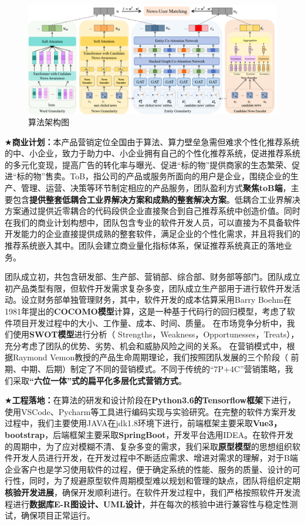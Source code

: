 \documentclass[withoutpreface,bwprint]{cumcmthesis} %
\begin{document}
		\begin{figure}[H]
				\includegraphics[width=1.0\textwidth]{MGCA}
			\caption{算法架构图}
			\label{fig:circuit-diagcam}
		\end{figure}
	    $\bigstar$\textbf{商业计划：}本产品营销定位全国由于算法、算力壁垒急需但难求个性化推荐系统的中、小企业，致力于助力中、小企业拥有自己的个性化推荐系统，促进推荐系统的多元化变现，提高广告的转化率与曝光、促进“标的物”提供商家的生态繁荣、促进“标的物”售卖。ToB，指公司的产品或服务所面向的用户是企业，围绕企业的生产、管理、运营、决策等环节制定相应的产品服务，团队盈利方式\textbf{聚焦toB端}，主要包含\textbf{提供整套低耦合工业界解决方案和成熟的整套解决方案}。低耦合工业界解决方案通过提供近零耦合的代码段供企业直接聚合到自己推荐系统中创造价值。同时在我们的商业计划构想中，团队包含专业的软件开发人员，可以直接为不具备软件开发能力的企业直接提供成熟的整套软件，满足企业的个性化需求，并且将我们的推荐系统嵌入其中。团队会建立商业量化指标体系，保证推荐系统真正的落地业务。\par
	    团队成立初，共包含研发部、生产部、营销部、综合部、财务部等部门。团队成立初产品类型有限，但软件开发需求复杂多变，团队成立生产部用于进行软件开发活动。设立财务部单独管理财务，其中，软件开发的成本估算采用Barry Boehm在1981年提出的\textbf{COCOMO模型}计算，这是一种基于代码行的回归模型，考虑了软件项目开发过程中的大小、工作量、成本、时间、质量。
	    在市场竞争分析中，我们使用\textbf{SWOT模型}进行分析（ Strengths，Weakness，Opportunesses，Treats），充分考虑了团队的优势、劣势、机会和威胁风险之间的关系。
	    在营销模式中，根据Raymond Vemon教授的产品生命周期理论，我们按照团队发展的三个阶段（ 前期、中期、后期）制定了不同的营销模式。不同于传统的“7P+4C”营销策略，我们采取\textbf{“六位一体”式的扁平化多层化式营销方式}。\par
	    $\bigstar$\textbf{工程落地：}在算法的研发和设计阶段在\textbf{Python3.6的Tensorflow框架}下进行，使用VSCode、Pycharm等工具进行编码实现与实验研究。在完整的软件方案开发过程中，我们主要使用JAVA在jdk1.8环境下进行，前端框架主要采取\textbf{Vue3，bootstrap}，后端框架主要采取\textbf{SpringBoot}，开发平台选用IDEA。在软件开发的周期中，为了应对模糊不清、复杂多变的需求，我们采取\textbf{原型模型}的思想组织软件开发人员进行开发，在开发过程中不断适应需求、增进对需求的理解，对于B端企业客户也是学习使用软件的过程，便于确定系统的性能、服务的质量、设计的可行性，同时，为了规避原型软件周期模型难以规划和管理的缺点，团队将组织定期\textbf{核验开发进展}，确保开发顺利进行。在软件开发过程中，我们严格按照软件开发流程进行\textbf{数据库E-R图设计、UML设计}，并在每次的核验中进行兼容性与稳定性测试，确保项目正常运行。\par
\end{document}
